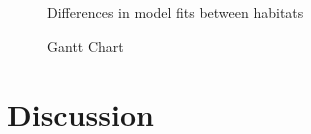 \documentclass[11pt]{article}
\begin{document}
	\newpage
	
	\begin{figure}[h!]
		
		
		\caption{Differences in model fits between habitats}
		
	\end{figure} 
	
	\newpage
	
	\begin{figure}[h!]
	
	
	\caption{	Gantt Chart}

	\end{figure} 

	\newpage
	
	\section*{Discussion}
	
	\newpage

	\printbibliography

	
\end{document}
